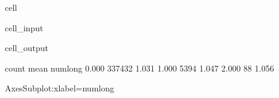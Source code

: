 \documentclass[letterpaper,10pt,english]{jupyterBook}
\begin{document}
\begin{sphinxuseclass}{cell}\begin{sphinxVerbatimInput}

\begin{sphinxuseclass}{cell_input}
\begin{sphinxVerbatim}[commandchars=\\\{\}]
  
\PYG{p}{[}\PYG{p}{]}\PYG{p}{[}\PYG{p}{]}
\PYG{p}{[}\PYG{p}{]} 
\end{sphinxVerbatim}

\end{sphinxuseclass}\end{sphinxVerbatimInput}
\begin{sphinxVerbatimOutput}

\begin{sphinxuseclass}{cell_output}
\begin{sphinxVerbatim}[commandchars=\\\{\}]
           count  mean
num\PYGZus{}long              
0.000     337432 1.031
1.000       5394 1.047
2.000         88 1.056
\end{sphinxVerbatim}

\begin{sphinxVerbatim}[commandchars=\\\{\}]
\PYGZlt{}AxesSubplot:xlabel=\PYGZsq{}num\PYGZus{}long\PYGZsq{}\PYGZgt{}
\end{sphinxVerbatim}

\noindent{}

\end{sphinxuseclass}\end{sphinxVerbatimOutput}

\end{sphinxuseclass}
\end{document}
